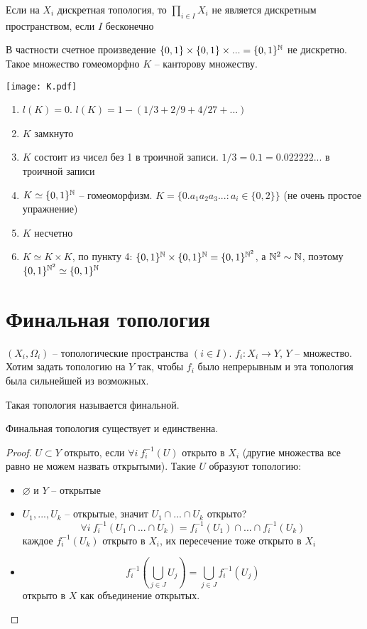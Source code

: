 \documentclass[main]{subfiles}
\begin{document}
\begin{property}
    Если на $X_i$ дискретная топология, то $\prod_{i \in I} X_i$ не является
    дискретным пространством, если $I$ бесконечно
\end{property}
В частности счетное произведение $\{0,1\} \times \{0,1\} \times ... = \{0, 1\}^{\mathbb{N}}$ не дискретно.
Такое множество гомеоморфно $K$ -- канторову множеству.
\begin{center}
    \texttt{[image: K.pdf]}
\end{center}
\begin{property}
    \begin{enumerate}
        \item $l(K) = 0$. $l(K) = 1 - (1/3 + 2/9 + 4/27 + ...)$
        \item $K$ замкнуто
        \item $K$ состоит из чисел без 1 в троичной записи. $1/3 = 0.1 = 0.022222...$ в троичной записи
        \item $K \simeq \{ 0,1 \}^{\mathbb{N}}$ -- гомеоморфизм.
              $K = \{0.a_1a_2a_3...: a_i \in \{0,2\}\}$ (не очень простое упражнение)
        \item  $K$ несчетно
        \item $K \simeq K \times K$,
              по пункту 4: $\{0,1\}^{\mathbb{N}} \times \{0,1\}^{\mathbb{N}} = \{0,1\}^{\mathbb{N}^2}$, а $\mathbb{N}^2 \sim \mathbb{N}$,
              поэтому $\{0,1\}^{\mathbb{N}^2} \simeq \{0,1\}^{\mathbb{N}}$
    \end{enumerate}
\end{property}

\section{Финальная топология}
$(X_i, \Omega_i)$ -- топологические пространства $(i \in I)$.
$f_i: X_i \to Y$, $Y$ -- множество. Хотим задать топологию на $Y$ так, чтобы $f_i$ было непрерывным
и эта топология была сильнейшей из возможных.
\begin{definition}
    Такая топология называется финальной.
\end{definition}
\begin{theorem}
    Финальная топология существует и единственна.
\end{theorem}
\begin{proof}
    $U \subset Y$ открыто, если $\forall i\ f_i^{-1}(U)$ открыто в $X_i$
    (другие множества все равно не можем назвать открытыми).
    Такие $U$ образуют топологию:
    \begin{itemize}
        \item $\varnothing$ и $Y$ -- открытые
        \item $U_1, ..., U_k$ -- открытые, значит $U_1 \cap ... \cap U_k$ открыто?
              \[\forall i\ f_i^{-1}(U_1 \cap ... \cap U_k) = f_i^{-1}(U_1) \cap ... \cap f_i^{-1}(U_k)\]
              каждое $f_i^{-1}(U_k)$ открыто в $X_i$, их пересечение тоже открыто в $X_i$
        \item \[f^{-1}_i\left( \bigcup_{j \in J} U_j\right) = \bigcup_{j \in J} f^{-1}_i (U_j)\]
              открыто в $X$ как объединение открытых.
    \end{itemize}
\end{proof}
\end{document}
